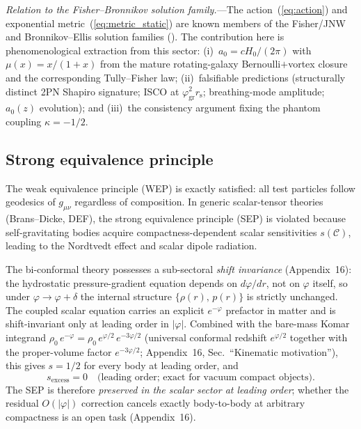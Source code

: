 \documentclass[aps,prd,onecolumn,superscriptaddress,nofootinbib,showpacs,12pt]{revtex4-2}
\newcommand{\rs}{r_{\mathrm{s}}}
\newcommand{\azero}{a_{0}}
\newcommand{\phigr}{\varphi_{\mathrm{gr}}}
\begin{document}
\textit{Relation to the Fisher--Bronnikov solution
family.}---The action~(\ref{eq:action}) and exponential
metric~(\ref{eq:metric_static}) are known members of the
Fisher/JNW and Bronnikov--Ellis solution families
(\cite{Fisher1948,JNW1968,Bronnikov1973,Ellis1973,Papapetrou1954,Yilmaz1958,Boonserm2020}).
The contribution here is phenomenological extraction from this
sector: (i)~$\azero = cH_{0}/(2\pi)$ with
$\mu(x)=x/(1+x)$ from the mature rotating-galaxy
Bernoulli$+$vortex closure and the corresponding
Tully--Fisher law;
(ii)~falsifiable predictions (structurally distinct 2PN Shapiro
signature; ISCO at $\phigr^{2}\rs$; breathing-mode amplitude;
$\azero(z)$ evolution); and
(iii)~the consistency argument fixing the phantom coupling
$\kappa=-1/2$.

\subsection{Strong equivalence principle}\label{sec:sep}

The weak equivalence principle (WEP) is exactly
satisfied: all test particles follow geodesics of
$g_{\mu\nu}$ regardless of composition.  In generic
scalar-tensor theories (Brans--Dicke, DEF), the strong
equivalence principle (SEP) is violated because
self-gravitating bodies acquire compactness-dependent
scalar sensitivities $s(\mathcal{C})$, leading to
the Nordtvedt effect and scalar dipole radiation.

The bi-conformal theory possesses a sub-sectoral
\emph{shift invariance} (Appendix~16): the hydrostatic
pressure-gradient equation depends on $d\varphi/dr$,
not on $\varphi$ itself, so under $\varphi \to \varphi +
\delta$ the internal structure $\{\rho(r),\,p(r)\}$ is
strictly unchanged.  The coupled scalar equation carries
an explicit $e^{-\varphi}$ prefactor in matter and is
shift-invariant only at leading order in $|\varphi|$.
Combined with the bare-mass Komar integrand
$\rho_0\,e^{-\varphi} = \rho_0\,e^{\varphi/2}\,e^{-3\varphi/2}$
(universal conformal redshift $e^{\varphi/2}$ together
with the proper-volume factor $e^{-3\varphi/2}$;
Appendix~16, Sec.~``Kinematic motivation''), this gives
$s = 1/2$ for every body at leading order, and
\begin{equation}\label{eq:s_excess_sep}
  s_{\mathrm{excess}} = 0 \quad
  \text{(leading order; exact for vacuum compact
  objects)}.
\end{equation}
The SEP is therefore \emph{preserved in the scalar
sector at leading order}; whether the residual
$O(|\varphi|)$ correction cancels exactly body-to-body
at arbitrary compactness is an open task (Appendix~16).
\end{document}
